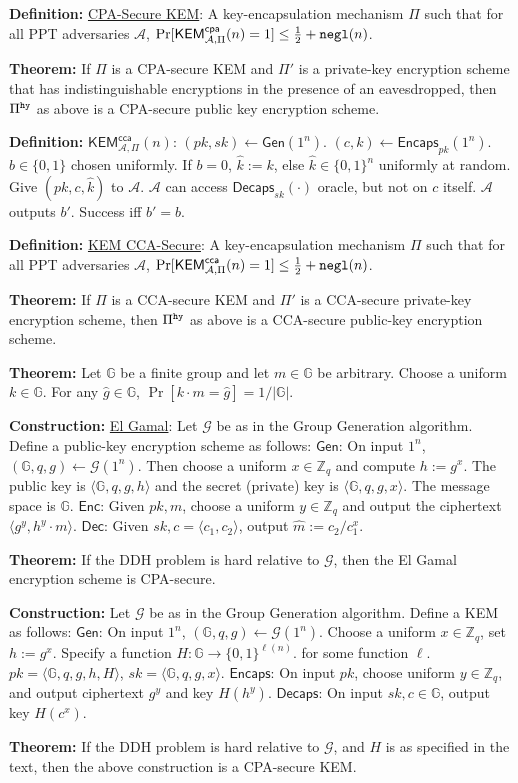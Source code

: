 \documentclass[10pt]{article}
\newcommand{\Z}{\mathbb{Z}}
\newcommand{\G}{\mathbb{G}}
\newcommand{\AAA}{\mathcal{A}}
\newcommand{\GGG}{\mathcal{G}}
\newcommand{\defn}[1]{{\bf Definition:} \underline{#1}}
\newcommand{\thm}[1]{{\bf Theorem:} \underline{#1}}
\newcommand{\con}[1]{{\bf Construction:} \underline{#1}}
\newcommand{\Enc}{\mathsf{Enc}}
\newcommand{\Dec}{\mathsf{Dec}}
\newcommand{\Encaps}{\mathsf{Encaps}}
\newcommand{\Decaps}{\mathsf{Decaps}}
\newcommand{\Gen}{\mathsf{Gen}}
\newcommand{\ang}[1]{\langle#1\rangle}
\newcommand{\ExptKemCpa}{\mathsf{KEM}^{\mathsf{cpa}}_{\AAA,\Pi}}
\newcommand{\ExptKemCca}{\mathsf{KEM}^{\mathsf{cca}}_{\AAA,\Pi}}
\newcommand{\negl}{{\tt negl}}
\newcommand{\hy}{{\tt hy}}
\newcommand{\from}{\leftarrow}
\begin{document}
\begin{multicols}{3}
\defn{CPA-Secure KEM}: A key-encapsulation mechanism $\Pi$ such that for all PPT adversaries $\AAA$, $\Pr[\ExptKemCpa(n)=1]\leq\frac{1}{2}+\negl(n)$.

\thm{}If $\Pi$ is a CPA-secure KEM and $\Pi'$ is a private-key encryption scheme that has indistinguishable encryptions in the presence of an eavesdropped, then $\Pi^\hy$ as above is a CPA-secure public key encryption scheme.

\defn{$\ExptKemCca(n)$}: $(pk,sk)\from\Gen(1^n)$. $(c,k)\from\Encaps_{pk}(1^n)$. $b\in\{0,1\}$ chosen uniformly. If $b=0$, $\hat{k}:=k$, else $\hat{k}\in\{0,1\}^n$ uniformly at random. Give $(pk,c,\hat{k})$ to $\AAA$. $\AAA$ can access $\Decaps_{sk}(\cdot)$ oracle, but not on $c$ itself. $\AAA$ outputs $b'$. Success iff $b'=b$.

\defn{KEM CCA-Secure}: A key-encapsulation mechanism $\Pi$ such that for all PPT adversaries $\AAA$, $\Pr[\ExptKemCca(n)=1]\leq\frac{1}{2}+\negl(n)$.

\thm{}If $\Pi$ is a CCA-secure KEM and $\Pi'$ is a CCA-secure private-key encryption scheme, then $\Pi^\hy$ as above is a CCA-secure public-key encryption scheme.

\thm{}Let $\G$ be a finite group and let $m\in\G$ be arbitrary. Choose a uniform $k\in\G$. For any $\hat{g}\in\G$, $\Pr[k\cdot m=\hat{g}]=1/|\G|$.

\con{El Gamal}: Let $\GGG$ be as in the Group Generation algorithm. Define a public-key encryption scheme as follows: $\Gen$: On input $1^n$, $(\G,q,g)\from\GGG(1^n)$. Then choose a uniform $x\in\Z_q$ and compute $h:=g^x$. The public key is $\ang{\G,q,g,h}$ and the secret (private) key is $\ang{\G,q,g,x}$. The message space is $\G$. $\Enc$: Given $pk,m$, choose a uniform $y\in\Z_q$ and output the ciphertext $\ang{g^y,h^y\cdot m}$. $\Dec$: Given $sk,c=\ang{c_1,c_2}$, output $\hat{m}:=c_2/c_1^x$.

\thm{}If the DDH problem is hard relative to $\GGG$, then the El Gamal encryption scheme is CPA-secure.

\con{}Let $\GGG$ be as in the Group Generation algorithm. Define a KEM as follows: $\Gen$: On input $1^n$, $(\G,q,g)\from\GGG(1^n)$. Choose a uniform $x\in\Z_q$, set $h:=g^x$. Specify a function $H:\G\to\{0,1\}^{\ell(n)}$. for some function $\ell$. $pk=\ang{\G,q,g,h,H}$, $sk=\ang{\G,q,g,x}$. $\Encaps$: On input $pk$, choose uniform $y\in\Z_q$, and output ciphertext $g^y$ and key $H(h^y)$. $\Decaps$: On input $sk,c\in\G$, output key $H(c^x)$.

\thm{}If the DDH problem is hard relative to $\GGG$, and $H$ is as specified in the text, then the above construction is a CPA-secure KEM.


\end{multicols}
\end{document}
